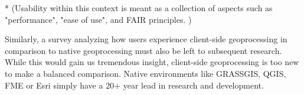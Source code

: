 * (Usability within this context is meant as a collection of aspects such as "performance", "ease of use", and FAIR principles. )

Similarly, a survey analyzing how users experience client-side geoprocessing in comparison to native geoprocessing must also be left to subsequent research. While this would gain us tremendous insight, client-side geoprocessing is too new to make a balanced comparison. Native environments like GRASSGIS, QGIS, FME or Esri simply have a 20+ year lead in research and development. 













